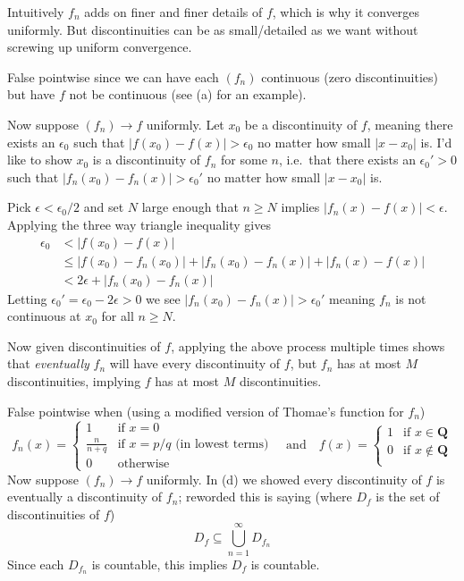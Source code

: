 \begin{solution}
{    Intuitively $f_n$ adds on finer and finer details of $f$, which is why it converges uniformly. But discontinuities can be as small/detailed as we want without screwing up uniform convergence.
  \item False pointwise since we can have each $(f_n)$ continuous (zero discontinuities) but have $f$ not be continuous (see (a) for an example).

    Now suppose $(f_n) \to f$ uniformly. Let $x_0$ be a discontinuity of $f$, meaning there exists an $\epsilon_0$ such that $|f(x_0)-f(x)| > \epsilon_0$ no matter how small $|x-x_0|$ is.
    I'd like to show $x_0$ is a discontinuity of $f_n$ for some $n$, i.e.\ that there exists an $\epsilon_0'>0$ such that $|f_n(x_0)-f_n(x)|>\epsilon_0'$ no matter how small $|x-x_0|$ is.

    Pick $\epsilon<\epsilon_0/2$ and set $N$ large enough that $n \ge N$ implies $|f_n(x)-f(x)|<\epsilon$. Applying the three way triangle inequality gives
    $$
    \begin{aligned}
    \epsilon_0
    &< |f(x_0) - f(x)| \\
    &\le |f(x_0) - f_n(x_0)| + |f_n(x_0) - f_n(x)| + |f_n(x) - f(x)| \\
    &< 2\epsilon + |f_n(x_0) - f_n(x)|
    \end{aligned}
    $$
    Letting $\epsilon_0' = \epsilon_0-2\epsilon > 0$ we see $|f_n(x_0) - f_n(x)| > \epsilon_0'$ meaning $f_n$ is not continuous at $x_0$ for all $n \ge N$.

    Now given discontinuities of $f$, applying the above process multiple times shows that \emph{eventually} $f_n$ will have every discontinuity of $f$, but $f_n$ has at most $M$ discontinuities, implying $f$ has at most $M$ discontinuities.
  \item False pointwise when (using a modified version of Thomae's function for $f_n$)
    $$
    f_n(x) = \begin{cases}
      1 &\text{if $x = 0$} \\
      \frac{n}{n+q} &\text{if $x = p/q$ (in lowest terms)} \\
      0 &\text{otherwise}
    \end{cases}
    \quad\text{and}\quad
    f(x) = \begin{cases}
      1 &\text{if $x \in \mathbf{Q}$} \\
      0 &\text{if $x \notin \mathbf{Q}$} \\
    \end{cases}
    $$
    Now suppose $(f_n) \to f$ uniformly. In (d) we showed every discontinuity of $f$ is eventually a discontinuity of $f_n$; reworded this is saying (where $D_f$ is the set of discontinuities of $f$)
    $$
    D_f \subseteq \bigcup_{n=1}^\infty D_{f_{n}}
    $$
    Since each $D_{f_n}$ is countable, this implies $D_f$ is countable.
  }
\end{solution}
